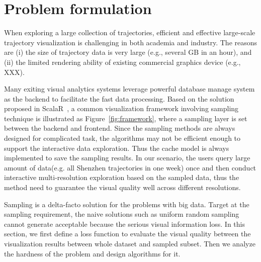 \section{Problem formulation}





When exploring a large collection of trajectories, efficient and effective large-scale trajectory visualization is challenging in both academia and industry.
The reasons are (i) the size of trajectory data is very large (e.g., several GB in an hour),
and (ii) the limited rendering ability of existing commercial graphics device (e.g., XXX).


Many exiting visual analytics systems leverage powerful database manage system as the backend to facilitate the fast data processing. Based on the solution proposed in ScalaR~\cite{battle2013dynamic}, a common visualization framework involving sampling technique is illustrated as Figure~\ref{fig:framework}, where a sampling layer is set between the backend and frontend. Since the sampling methods are always designed for complicated task, the algorithms may not be efficient enough to support the interactive data exploration. Thus the cache model is always implemented to save the sampling results. In our scenario, the users query large amount of data(e.g. all Shenzhen trajectories in one week) once and then conduct interactive multi-resolution exploration based on the sampled data, thus the method need to guarantee the visual quality well across different resolutions.

Sampling is a delta-facto solution for the problems with big data. Target at the sampling requirement, the naive solutions such as uniform random sampling cannot generate acceptable because the serious visual information loss. In this section, we first define a loss function to evaluate the visual quality between the visualization results between whole dataset and sampled subset. Then we analyze the hardness of the problem and design algorithms for it.  



